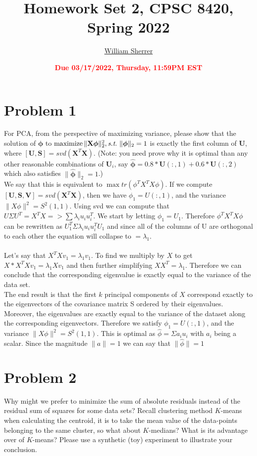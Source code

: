 \documentclass[11pt]{article}
\title{{\bf Homework Set 2, CPSC 8420, Spring 2022}} %
\author{\Large\underline{William Sherrer}}
\date{\textbf{\Large\textcolor{red}{Due 03/17/2022, Thursday, 11:59PM EST}}} %
\newcommand{\maximize}{\operatorname*{maximize}}
\newcommand{\mtx}[1]{\mathbf{#1}}
\def \mU {\mtx{U}}
\def \mS {\mtx{S}}
\def \mV {\mtx{V}}
\def \mX {\mtx{X}}
\begin{document}
	\maketitle
	

	\section*{Problem 1}
	For PCA, from the perspective of maximizing variance, please show that the solution of $\bm{\phi}$ to $\maximize \|\mX \bm{\phi}\|^2_2, \st \ \|\bm{\phi}\|_2=1$ is exactly the first column of $\mU$, where $[\mU,\mS]=svd(\mX^T\mX)$. (Note: you need prove why it is optimal than any other reasonable combinations of $\mU_i$, say $\hat{\bm{\phi}}=0.8*\mU(:,1)+0.6*\mU(:,2)$ which also  satisfies $\|\hat{\bm{\phi}}\|_2=1$.)\\
	
	
We say that this is equivalent to $\max tr(\phi^T X^T X \phi)$. If we compute $[\mU,\mS, \mV]=svd(\mX^T\mX)$, then we have $\phi_1 = U(:, 1)$, and the variance $\| X \phi \|^2 = S^2(1,1)$. Using svd we can compute that $U \Sigma U^T = X^T X => \sum{\lambda_i u_i u^T_i}$. We start by letting $\phi_1 = U_1$. Therefore $\phi^T X^T X \phi$ can be rewritten as $U_1^T \Sigma \lambda_i u_i u^T_i U_1$ and since all of the columns of U are orthogonal to each other the equation will collapse  to $= \lambda_1$.\\\\

Let's say that $X^TXv_1 = \lambda_1 v_1$. To find  we multiply by $X$ to get $X* X^TXv_1 = \lambda_1 X v_1$ and then further simplifying $XX^T = \lambda_1$. Therefore we can conclude that the corresponding eigenvalue is exactly equal to the variance of the data set.\\

The end result is that the first $k$ principal components of $X$ correspond exactly to the eigenvectors of the covariance matrix S ordered by their eigenvalues. Moreover, the eigenvalues are exactly equal to the variance of the dataset along the corresponding eigenvectors. Therefore we satisfy $\phi_1 = U(:, 1)$, and the variance $\| X \phi \|^2 = S^2(1,1)$. This is optimal as $\hat{\phi} = \Sigma a_i u_i$ with $a_i$ being a scalar. Since the magnitude $\|a\| = 1$ we can say that $\|\hat{\phi}\| = 1$
	
	\section*{Problem 2}
	Why might we prefer to minimize the sum of absolute residuals instead of the residual sum of squares for some data sets? Recall clustering method $K$-means when calculating the centroid, it is to take the mean value of the data-points belonging to the same cluster, so what about $K$-medians? What is its advantage over of $K$-means? Please use a synthetic (toy) experiment to illustrate your conclusion.\\\\
	
\end{document}
